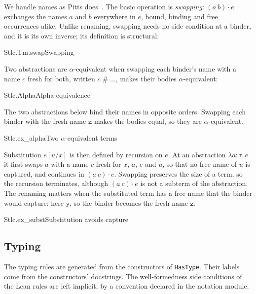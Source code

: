 \documentclass{article}
\begin{document}
We handle names as Pitts does~\cite{Pitts06}. The basic operation is
\emph{swapping}: $(a\ b) \cdot e$ exchanges the names $a$ and $b$
everywhere in $e$, bound, binding and free occurrences alike. Unlike
renaming, swapping needs no side condition at a binder, and it is its own
inverse; its definition is structural:

\begin{center}
\begin{leanblock}[view=math, def]{Stlc.Tm.swap}{Swapping}
\end{leanblock}
\end{center}

Two abstractions are $\alpha$-equivalent when swapping each binder's name
with a name $c$ fresh for both, written $c \mathrel{\#} \ldots$, makes their
bodies $\alpha$-equivalent:

\begin{leanrules}{Stlc.Alpha}{Alpha-equivalence}
\end{leanrules}

The two abstractions below bind their names in opposite orders. Swapping each
binder with the fresh name $\mathtt{z}$ makes the bodies equal, so they are
$\alpha$-equivalent.

\begin{leanexample}{Stlc.ex_alpha}{Two $\alpha$-equivalent terms}
\end{leanexample}

Substitution $e[u/x]$ is then defined by recursion on $e$. At an abstraction
$\lambda a{:}\tau.\, e$ it first swaps $a$ with a name $c$ fresh for $x$,
$a$, $e$ and $u$, so that no free name of $u$ is captured, and continues in
$(a\ c) \cdot e$. Swapping preserves the size of a
term, so the recursion terminates, although
$(a\ c) \cdot e$ is not a subterm of the abstraction. The renaming matters
when the substituted term has a free name that the binder would capture: here
$\mathtt{y}$, so the binder becomes the fresh name $\mathtt{z}$.

\begin{leanexample}{Stlc.ex_subst}{Substitution avoids capture}
\end{leanexample}

\subsection{Typing}

The typing rules are generated from the constructors of \texttt{HasType}.
Their labels come from the constructors' docstrings. The well-formedness side
conditions of the Lean rules are left implicit, by a convention declared in
the notation module.
\end{document}

